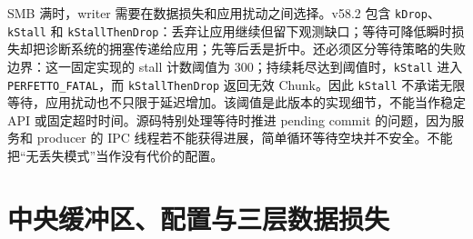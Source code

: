 \documentclass[UTF8,fontset=fandol,openany,11pt]{ctexbook}
\begin{document}
SMB 满时，writer 需要在数据损失和应用扰动之间选择。v58.2 包含 \texttt{kDrop}、\texttt{kStall} 和 \texttt{kStallThenDrop}：丢弃让应用继续但留下观测缺口；等待可降低瞬时损失却把诊断系统的拥塞传递给应用；先等后丢是折中。还必须区分等待策略的失败边界：这一固定实现的 stall 计数阈值为 300；持续耗尽达到阈值时，\texttt{kStall} 进入 \texttt{PERFETTO\_\allowbreak{}FATAL}，而 \texttt{kStallThenDrop} 返回无效 Chunk。因此 \texttt{kStall} 不承诺无限等待，应用扰动也不只限于延迟增加。该阈值是此版本的实现细节，不能当作稳定 API 或固定超时时间。源码特别处理等待时推进 pending commit 的问题，因为服务和 producer 的 IPC 线程若不能获得进展，简单循环等待空块并不安全。不能把“无丢失模式”当作没有代价的配置。\cite{pf-arbiter}


\section{中央缓冲区、配置与三层数据损失}
\end{document}
